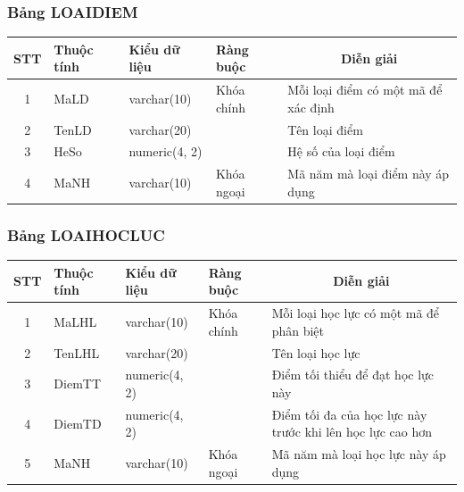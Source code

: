 \documentclass[a4paper]{article}
\begin{document}
\subsubsection{Bảng LOAIDIEM}
\begin{table}[H]
\centering
\renewcommand{\arraystretch}{1.5}
\setlength{\tabcolsep}{12pt}
\begin{tabular}{|c|l|l|l|p{5cm}|}
\hline
\textbf{STT} & \textbf{Thuộc tính} & \textbf{Kiểu dữ liệu} & \textbf{Ràng buộc} & \multicolumn{1}{|c|}{\textbf{Diễn giải}} \\
\hline
1 & MaLD & varchar(10) & Khóa chính & Mỗi loại điểm có một mã để xác định \\
\hline
2 & TenLD & varchar(20) & & Tên loại điểm \\
\hline
3 & HeSo & numeric(4, 2) & & Hệ số của loại điểm \\
\hline
4 & MaNH & varchar(10) & Khóa ngoại & Mã năm mà loại điểm này áp dụng \\
\hline
\end{tabular}
\end{table}


\subsubsection{Bảng LOAIHOCLUC}
\begin{table}[H]
\centering
\renewcommand{\arraystretch}{1.5}
\setlength{\tabcolsep}{12pt}
\begin{tabular}{|c|l|l|l|p{5cm}|}
\hline
\textbf{STT} & \textbf{Thuộc tính} & \textbf{Kiểu dữ liệu} & \textbf{Ràng buộc} & \multicolumn{1}{|c|}{\textbf{Diễn giải}} \\
\hline
1 & MaLHL & varchar(10) & Khóa chính & Mỗi loại học lực có một mã để phân biệt \\
\hline
2 & TenLHL & varchar(20) & & Tên loại học lực \\
\hline
3 & DiemTT & numeric(4, 2) & & Điểm tối thiểu để đạt học lực này \\
 \hline
4 & DiemTD & numeric(4, 2) & & Điểm tối đa của học lực này trước khi lên học lực cao hơn \\
\hline
5 & MaNH & varchar(10) & Khóa ngoại & Mã năm mà loại học lực này áp dụng \\
\hline
\end{tabular}
\end{table}
\end{document}
